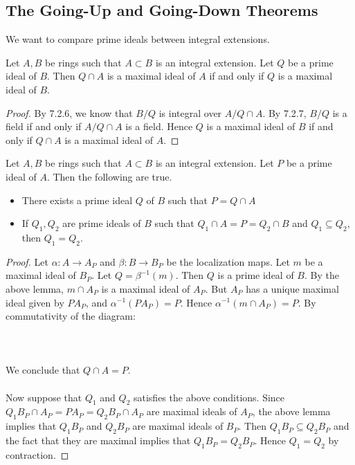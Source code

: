\documentclass[a4paper]{article}
\begin{document}
\subsection{The Going-Up and Going-Down Theorems}
We want to compare prime ideals between integral extensions. 

\begin{lmm}{}{} Let $A,B$ be rings such that $A\subset B$ is an integral extension. Let $Q$ be a prime ideal of $B$. Then $Q\cap A$ is a maximal ideal of $A$ if and only if $Q$ is a maximal ideal of $B$. \tcbline
\begin{proof}
By 7.2.6, we know that $B/Q$ is integral over $A/Q\cap A$. By 7.2.7, $B/Q$ is a field if and only if $A/Q\cap A$ is a field. Hence $Q$ is a maximal ideal of $B$ if and only if $Q\cap A$ is a maximal ideal of $A$. 
\end{proof}
\end{lmm}

\begin{prp}{}{} Let $A,B$ be rings such that $A\subset B$ is an integral extension. Let $P$ be a prime ideal of $A$. Then the following are true. 
\begin{itemize}
\item There exists a prime ideal $Q$ of $B$ such that $P=Q\cap A$
\item If $Q_1,Q_2$ are prime ideals of $B$ such that $Q_1\cap A=P=Q_2\cap B$ and $Q_1\subseteq Q_2$, then $Q_1=Q_2$. 
\end{itemize} \tcbline
\begin{proof}
Let $\alpha:A\to A_P$ and $\beta:B\to B_P$ be the localization maps. Let $m$ be a maximal ideal of $B_P$. Let $Q=\beta^{-1}(m)$. Then $Q$ is a prime ideal of $B$. By the above lemma, $m\cap A_P$ is a maximal ideal of $A_P$. But $A_P$ has a unique maximal ideal given by $PA_P$, and $\alpha^{-1}(PA_P)=P$. Hence $\alpha^{-1}(m\cap A_P)=P$. By commutativity of the diagram: \\~\\
\\~\\
We conclude that $Q\cap A=P$. \\~\\

Now suppose that $Q_1$ and $Q_2$ satisfies the above conditions. Since $Q_1B_P\cap A_P=PA_P=Q_2B_P\cap A_P$ are maximal ideals of $A_P$, the above lemma implies that $Q_1B_P$ and $Q_2B_P$ are maximal ideals of $B_P$. Then $Q_1B_P\subseteq Q_2B_P$ and the fact that they are maximal implies that $Q_1B_P=Q_2B_P$. Hence $Q_1=Q_2$ by contraction. 
\end{proof}
\end{prp}
\end{document}
